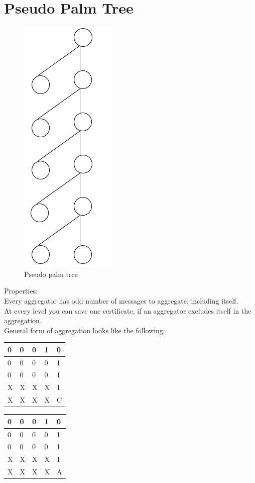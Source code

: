 \section{Pseudo Palm Tree}
	\begin{figure}[hp]
		\centering
		\includegraphics[scale = 0.5]{images/pseudo-palm-tree}
		\caption{Pseudo palm tree}
	\end{figure}
	
	Properties: \\
		Every aggregator has odd number of messages to aggregate, including itself.\\
		At every level you can save one certificate, if an aggregator excludes itself in the aggregation.\\
		General form of aggregation looks like the following:
	\begin{multicols}{2}
		\begin{tabular}{ l | l l l l }
			0 & 0 & 0 & 1 & 0 \\
			\hline
			0 & 0 & 0 & 0 & 1 \\
			0 & 0 & 0 & 0 & 1 \\
			X & X & X & X & 1 \\
			\hline
			X & X & X & X & C \\
		\end{tabular}
		\columnbreak{|}
		\begin{tabular}{ l | l l l l }
			0 & 0 & 0 & 1 & 0 \\
			\hline
			0 & 0 & 0 & 0 & 1 \\
			0 & 0 & 0 & 0 & 1 \\
			X & X & X & X & 1 \\
			\hline
			X & X & X & X & A \\
		\end{tabular}
	\end{multicols}

